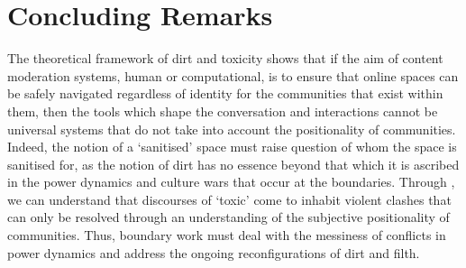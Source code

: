 \section{Concluding Remarks}\label{sec:filter_conclusion}

The theoretical framework of dirt and toxicity shows that if the aim of content moderation systems, human or computational, is to ensure that online spaces can be safely navigated regardless of identity for the communities that exist within them, then the tools which shape the conversation and interactions cannot be universal systems that do not take into account the positionality of communities.
Indeed, the notion of a `sanitised' space must raise question of whom the space is sanitised for, as the notion of dirt has no essence beyond that which it is ascribed in the power dynamics and culture wars that occur at the boundaries.
Through \citet{Risam:2015}, we can understand that discourses of `toxic' come to inhabit violent clashes that can only be resolved through an understanding of the subjective positionality of communities.
Thus, boundary work must deal with the messiness of conflicts in power dynamics and address the ongoing reconfigurations of dirt and filth.

